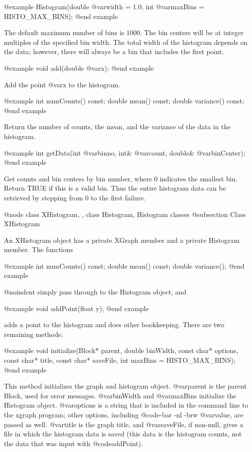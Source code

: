 @example
Histogram(double @var{width} = 1.0, int @var{maxBins} = HISTO_MAX_BINS);
@end example

The default maximum number of bins is 1000.  The bin centers will be at
integer multiples of the specified bin width.  The total width of the
histogram depends on the data; however, there will always be a bin that
includes the first point.

@example
void add(double @var{x});
@end example

Add the point @var{x} to the histogram.

@example
int numCounts() const;
double mean() const;
double variance() const;
@end example

Return the number of counts, the mean, and the variance of the data
in the histogram.

@example
int getData(int @var{binno}, int& @var{count}, double& @var{binCenter});
@end example

Get counts and bin centers by bin number, where 0 indicates the smallest
bin.  Return TRUE if this is a valid bin.  Thus the entire histogram
data can be retrieved by stepping from 0 to the first failure.

@node class XHistogram,  , class Histogram, Histogram classes
@subsection Class XHistogram

An XHistogram object has a private XGraph member and a private Histogram
member.  The functions

@example
int numCounts() const;
double mean() const;
double variance();
@end example

@noindent
simply pass through to the Histogram object, and

@example
void addPoint(float y);
@end example

adds a point to the histogram and does other bookkeeping.  There
are two remaining methods:

@example
void initialize(Block* parent, double binWidth,
   const char* options, const char* title,
   const char* saveFile, int maxBins = HISTO_MAX_BINS);
@end example

This method initializes the graph and histogram object.  @var{parent}
is the parent Block, used for error messages.  @var{binWidth} and
@var{maxBins} initialize the Histogram object.  @var{options} is a
string that is included in the command line to the xgraph program;
other options, including @code{-bar -nl -brw @var{value}}, are passed as
well.  @var{title} is the graph title, and @var{saveFile}, if non-null,
gives a file in which the histogram data is saved (this data is the
histogram counts, not the data that was input with @code{addPoint}).

